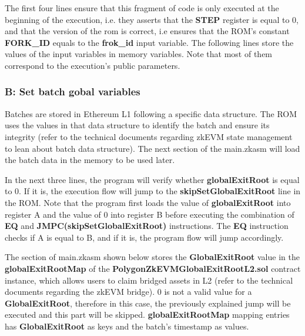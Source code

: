 The first four lines ensure that this fragment of code is only executed at the beginning of the execution, i.e. they asserts that the \textbf{STEP} register is equal to 0, and that the version of the rom is correct, i.e ensures that the ROM's constant \textbf{FORK\_ID} equals to the \textbf{frok\_id} input variable. The following lines store the values of the input variables in memory variables. Note that most of them correspond to the execution's public parameters.

\subsubsection{B: Set batch gobal variables}

Batches are stored in Ethereum L1 following a specific data structure. The ROM uses the values in that data structure to identify the batch and ensure its integrity (refer to the technical documents regarding zkEVM state management to lean about batch data structure). The next section of the main.zkasm will load the batch data in the memory to be used later.

In the next three lines, the program will verify whether \textbf{globalExitRoot} is equal to 0. If it is, the execution flow will jump to the \textbf{skipSetGlobalExitRoot} line in the ROM. Note that the program first loads the value of \textbf{globalExitRoot} into register A and the value of 0 into register B before executing the combination of \textbf{EQ} and \textbf{JMPC(skipSetGlobalExitRoot)} instructions. The \textbf{EQ} instruction checks if A is equal to B, and if it is, the program flow will jump accordingly.


The section of main.zkasm shown below stores the \textbf{GlobalExitRoot} value in the \textbf{globalExitRootMap} of the \textbf{PolygonZkEVMGlobalExitRootL2.sol} contract instance, which allows users to claim bridged assets in L2 (refer to the technical documents regarding the zkEVM bridge). 0 is not a valid value for a \textbf{GlobalExitRoot}, therefore in this case, the previously explained jump will be executed and this part will be skipped. \textbf{globalExitRootMap} mapping entries has \textbf{GlobalExitRoot} as keys and the batch's timestamp as values.

